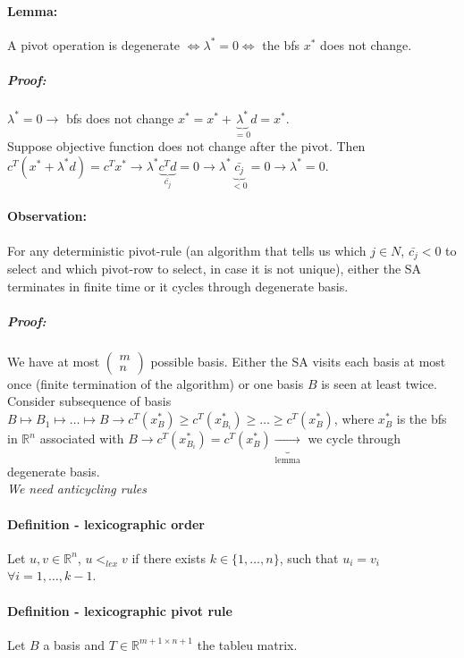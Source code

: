 \documentclass[main]{subfiles}
\begin{document}
\paragraph{Lemma:} A pivot operation is degenerate $\iff \lambda^* = 0 \iff$
the bfs $x^*$ does not change.

\subparagraph{Proof:}

$\lambda^* = 0 \rightarrow$ bfs does not change $x^* = x^* +
\underbrace{\lambda^*}_{=0} d = x^*$.\\
Suppose objective function does not change after the pivot. Then $c^T(x^* +
\lambda^* d) = c^T x^* \rightarrow \lambda^* \underbrace{c^T d}_{\bar{c_j}} = 0
\rightarrow \lambda^* \underbrace{\bar{c_j}}_{< 0} = 0 \rightarrow \lambda^* =
0$.

\paragraph{Observation:} For any deterministic pivot-rule (an algorithm that
tells us which $j \in N$, $\bar{c_j} < 0$ to select and which pivot-row to
select, in case it is not unique), either the SA terminates in finite time or
it cycles through degenerate basis.

\subparagraph{Proof:}
We have at most
$
\begin{pmatrix}
m \\
n
\end{pmatrix}$ possible basis. Either the SA visits each basis at most once
(finite termination of the algorithm) or one basis $B$ is seen at least twice.
Consider subsequence of basis $B \mapsto B_1 \mapsto \dots \mapsto B
\rightarrow c^T(x^*_B) \geq c^T(x^*_{B_i}) \geq \dots \geq c^T(x^*_B)$, where
$x^*_B$ is the bfs in $\mathbb{R}^n$ associated with $B \rightarrow
c^T(x^*_{B_i}) = c^T(x^*_B) \underbrace{\rightarrow}_{\text{lemma}}$ we cycle
through degenerate basis.\\

\emph{We need anticycling rules}

\paragraph{Definition - lexicographic order}
Let $u, v \in \mathbb{R}^n$, $u <_{lex} v$ if there exists $k \in
\{1, \dots, n\}$, such that $u_i = v_i$ $\forall i = 1, \dots, k-1$.

\paragraph{Definition - lexicographic pivot rule}
Let $B$ a basis and $T \in \mathbb{R}^{m+1 \times n+1}$ the tableu matrix.
\end{document}
